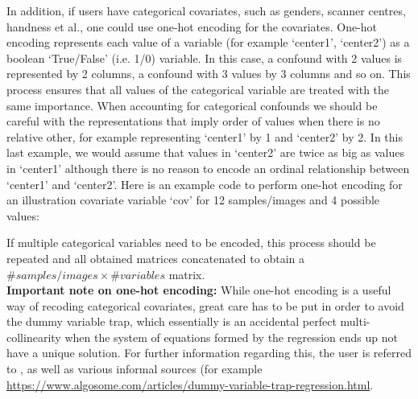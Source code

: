 In addition, if users have categorical covariates, such as genders, scanner centres, handness et al., one could use one-hot encoding for the covariates. One-hot encoding represents each value of a variable (for example `center1', `center2') as a boolean `True/False' (i.e. 1/0) variable. In this case, a confound with 2 values is represented by 2 columns, a confound with 3 values by 3 columns and so on. This process ensures that all values of the categorical variable are treated with the same importance. When accounting for categorical confounds we should be careful with the representations that imply order of values when there is no relative other, for example representing `center1' by 1 and `center2' by 2. In this last example, we would assume that values in `center2' are twice as big as values in `center1' although there is no reason to encode an ordinal relationship between `center1' and `center2'. Here is an example code to perform one-hot encoding for an illustration covariate variable `cov' for 12 samples/images and 4 possible values: \linebreak

\noindent{}

If multiple categorical variables need to be encoded, this process should be repeated and all obtained matrices concatenated to obtain a $\# samples/images \times \# variables$ matrix.
\\

\noindent \textbf{Important note on one-hot encoding:} While one-hot encoding is a useful way of recoding categorical covariates, great care has to be put in order to avoid the dummy variable trap, which essentially is an accidental perfect multi-collinearity when the system of equations formed by the regression ends up not have a unique solution. For further information regarding this, the user is referred to \cite{suits1957dummy}, as well as various informal sources (for example \url{https://www.algosome.com/articles/dummy-variable-trap-regression.html}.
\\

